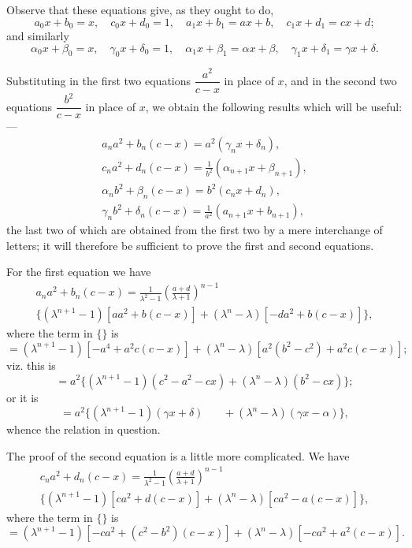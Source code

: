 \documentclass[12pt,a4paper,oneside]{book}
\theoremstyle{plain}
\theoremstyle{definition}
\theoremstyle{remark}
\begin{document}
Observe that these equations give, as they ought to do,
\[
a_0 x + b_0 = x,\quad c_0 x + d_0 = 1,\quad a_1 x + b_1 = ax+b,\quad c_1 x + d_1 = cx+d;
\]
and similarly
\[
\alpha_0 x + \beta_0 = x,\quad \gamma_0 x + \delta_0 = 1,\quad 
\alpha_1 x + \beta_1 = \alpha x+\beta,\quad \gamma_1 x + \delta_1 = \gamma x+\delta.
\]

Substituting in the first two equations $\dfrac{a^2}{c-x}$ in place of $x$, and in the second two equations $\dfrac{b^2}{c-x}$ in place of $x$, we obtain the following results which will be useful:---
\begin{gather*}
a_n a^2 + b_n(c-x) = a^2(\gamma_n x + \delta_n),\\
c_n a^2 + d_n(c-x) = \frac{1}{b^2}(\alpha_{n+1} x + \beta_{n+1}),\\
\alpha_n b^2 + \beta_n(c-x) = b^2(c_n x + d_n),\\
\gamma_n b^2 + \delta_n(c-x) = \frac{1}{a^2}(a_{n+1} x + b_{n+1}),
\end{gather*}
the last two of which are obtained from the first two by a mere interchange of letters; it will therefore be sufficient to prove the first and second equations.

For the first equation we have
\begin{multline*}
a_n a^2 + b_n(c-x) = \frac{1}{\lambda^2-1}\left(\frac{a+d}{\lambda+1}\right)^{n-1}\\
\{ (\lambda^{n+1}-1)[aa^2 + b(c-x)] + (\lambda^n-\lambda)[-da^2 + b(c-x)] \},
\end{multline*}
where the term in $\{\}$ is
\[
= (\lambda^{n+1}-1)[-a^4 + a^2c(c-x)] + (\lambda^n-\lambda)[a^2(b^2-c^2) + a^2c(c-x)];
\]
viz. this is
\[
= a^2 \{ (\lambda^{n+1}-1)(c^2-a^2-cx) + (\lambda^n-\lambda)(b^2-cx) \};
\]
or it is
\[
= a^2 \{ (\lambda^{n+1}-1)(\gamma x + \delta) \phantom{mm} + (\lambda^n-\lambda)(\gamma x - \alpha) \},
\]
whence the relation in question.

The proof of the second equation is a little more complicated. We have
\begin{multline*}
c_n a^2 + d_n(c-x) = \frac{1}{\lambda^2-1}\left(\frac{a+d}{\lambda+1}\right)^{n-1}\\
\{ (\lambda^{n+1}-1)[ca^2 + d(c-x)] + (\lambda^n-\lambda)[ca^2 - a(c-x)] \},
\end{multline*}
where the term in $\{\}$ is
\[
= (\lambda^{n+1}-1)[-ca^2 + (c^2-b^2)(c-x)] + (\lambda^n-\lambda)[-ca^2 + a^2(c-x)].
\]
\end{document}

